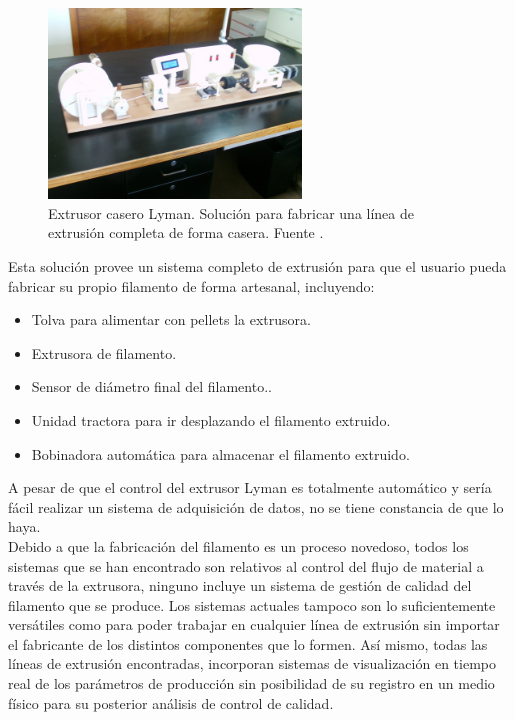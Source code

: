 \begin{figure}[h!]
    \centering
    \includegraphics[width=0.6\textwidth]{images/lyman.jpg}
    \caption[Extrusor casero Lyman.]{Extrusor casero Lyman. Solución para fabricar una línea de extrusión completa de forma casera. Fuente \cite{lyman}.}
    \label{fig:extr_lyman}
\end{figure}

Esta solución provee un sistema completo de extrusión para que el usuario pueda fabricar su propio filamento de forma artesanal, incluyendo:

\begin{itemize}
    \item{Tolva para alimentar con pellets la extrusora.}
    \item{Extrusora de filamento.}
    \item{Sensor de diámetro final del filamento..}
    \item{Unidad tractora para ir desplazando el filamento extruido.}
    \item{Bobinadora automática para almacenar el filamento extruido.}
\end{itemize}

A pesar de que el control del extrusor Lyman es totalmente automático y sería fácil realizar un sistema de adquisición de datos, no se tiene constancia de que lo haya.\\

Debido a que la fabricación del filamento es un proceso novedoso, todos los sistemas que se han encontrado son relativos al control del flujo de material a través de la extrusora, ninguno incluye un sistema de gestión de calidad del filamento que se produce. Los sistemas actuales tampoco son lo suficientemente versátiles como para poder trabajar en cualquier línea de extrusión sin importar el fabricante de los distintos componentes que lo formen. Así mismo, todas las líneas de extrusión encontradas, incorporan sistemas de visualización en tiempo real de los parámetros de producción sin posibilidad de su registro en un medio físico para su posterior análisis de control de calidad.\\

